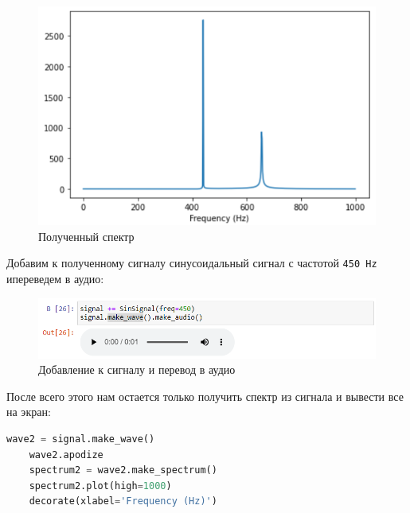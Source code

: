 \documentclass[a4paper]{article}
\begin{document}
            \begin{figure}[H]
                \centering
                \includegraphics[width=\textwidth]{spectr_sum_result.png}
                \caption{Полученный спектр}
                \label{fig:spectr_sum_result}
            \end{figure}
            
            Добавим к полученному сигналу синусоидальный сигнал с частотой \texttt{450 Hz} ипереведем в аудио:
            
            \begin{figure}[H]
                \centering
                \includegraphics[width=\textwidth]{spectr_sum_add.png}
                \caption{Добавление к сигналу и перевод в аудио}
                \label{fig:spectr_sum_add}
            \end{figure}
            
            После всего этого нам остается только получить спектр из сигнала и вывести все на экран:
            
\begin{lstlisting}[language=Python, caption= Получение спектра и вывод на экран]
    wave2 = signal.make_wave()
    wave2.apodize
    spectrum2 = wave2.make_spectrum()
    spectrum2.plot(high=1000)
    decorate(xlabel='Frequency (Hz)')
\end{lstlisting}
            
\end{document}
